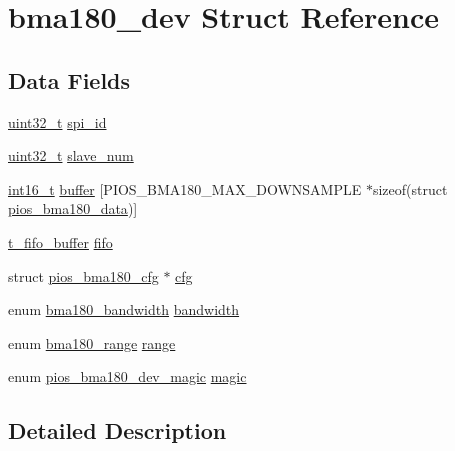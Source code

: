 \hypertarget{structbma180__dev}{\section{bma180\-\_\-dev Struct Reference}
\label{structbma180__dev}
}
\subsection*{Data Fields}
\begin{DoxyCompactItemize}
\item 
\hyperlink{stdint_8h_a435d1572bf3f880d55459d9805097f62}{uint32\-\_\-t} \hyperlink{structbma180__dev_aa0e8c93b86245e1fd072692c70d8df2d}{spi\-\_\-id}
\item 
\hyperlink{stdint_8h_a435d1572bf3f880d55459d9805097f62}{uint32\-\_\-t} \hyperlink{structbma180__dev_a9743ebc53aa6398ca08d7b796228b47c}{slave\-\_\-num}
\item 
\hyperlink{stdint_8h_aa343fa3b3d06292b959ffdd4c4703b06}{int16\-\_\-t} \hyperlink{structbma180__dev_ab15069f2ae1a91840b59b781df64d014}{buffer} \mbox{[}P\-I\-O\-S\-\_\-\-B\-M\-A180\-\_\-\-M\-A\-X\-\_\-\-D\-O\-W\-N\-S\-A\-M\-P\-L\-E $\ast$sizeof(struct \hyperlink{structpios__bma180__data}{pios\-\_\-bma180\-\_\-data})\mbox{]}
\item 
\hyperlink{structt__fifo__buffer}{t\-\_\-fifo\-\_\-buffer} \hyperlink{structbma180__dev_a5ea7560cd48ca5ad1fc285a2ff3084c8}{fifo}
\item 
struct \hyperlink{structpios__bma180__cfg}{pios\-\_\-bma180\-\_\-cfg} $\ast$ \hyperlink{structbma180__dev_ad7ed883d14d9f455e17d12157471501d}{cfg}
\item 
enum \hyperlink{group___p_i_o_s___b_m_a180_gacd6d3ecff286f705778973637b4d3d99}{bma180\-\_\-bandwidth} \hyperlink{structbma180__dev_ac532f2e8a6bae6b073f5491851d59293}{bandwidth}
\item 
enum \hyperlink{group___p_i_o_s___b_m_a180_ga319b0b37d7184097d2ae4e7ba527a416}{bma180\-\_\-range} \hyperlink{structbma180__dev_a85103d7472326b03f89d2b658d56aecc}{range}
\item 
enum \hyperlink{group___p_i_o_s___b_m_a180_ga019b2d5aa99a1a8e1b760c201899fa64}{pios\-\_\-bma180\-\_\-dev\-\_\-magic} \hyperlink{structbma180__dev_ad45772028b3de22401b0bcf218c289e9}{magic}
\end{DoxyCompactItemize}


\subsection{Detailed Description}


